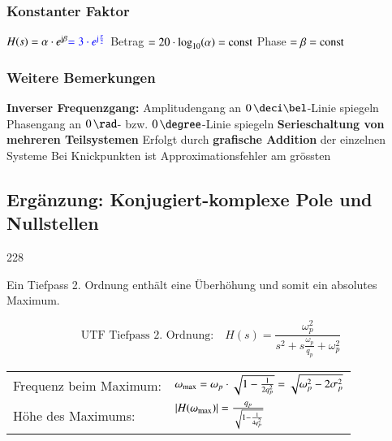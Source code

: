 \vspace{0.2cm}

\begin{minipage}[t]{0.48\columnwidth}
    \raggedright
    \subsubsection{Konstanter Faktor}

    \begin{outline}
        \1 $H(s) = \alpha \cdot e^{\mathrm{j} \beta} {\color{blue}= 3 \cdot e^{\mathrm{j} \frac{\pi}{2}}}$
            \2 Betrag $= 20 \cdot \log_{10}(\alpha) = \mathrm{const}$
            \2 Phase $= \beta = \mathrm{const}$
    \end{outline}
    
    
\end{minipage}
\hfill
\begin{minipage}[t]{0.48\columnwidth}
    \raggedright
    \subsubsection{Weitere Bemerkungen}

    \begin{outline}
        \1 \textbf{Inverser Frequenzgang:}
            \2 Amplitudengang an $0 \, \deci \bel$-Linie spiegeln
            \2 Phasengang an $0 \, \rad$- bzw. $0 \, \degree$-Linie spiegeln
        \1 \textbf{Serieschaltung von mehreren Teilsystemen}
            \2 Erfolgt durch \textbf{grafische Addition} der einzelnen Systeme
        \1 Bei Knickpunkten ist Approximationsfehler am grössten
    \end{outline}

\end{minipage}


\subsection{Ergänzung: Konjugiert-komplexe Pole und Nullstellen}{228}

Ein Tiefpass 2. Ordnung enthält eine Überhöhung und somit ein absolutes Maximum. 

$$ \text{UTF Tiefpass 2. Ordnung:} \quad H(s) = \frac{\omega_p^2}{s^2 + s \frac{\omega_p}{q_p} + \omega_p^2} $$

\renewcommand{\arraystretch}{2}
\begin{tabular}{ll}
    Frequenz beim Maximum:  & $ \omega_{\rm max} = \omega_p \cdot \sqrt{1 - \frac{1}{2 q_p^2}} = \sqrt{\omega_p^2 - 2 \sigma_p^2}$ \\
    Höhe des Maximums:      & $ \left|H(\omega_{\rm max})\right| = \frac{q_p}{\sqrt{1 - \frac{1}{4 q_p^2}}}$ \\
\end{tabular}

